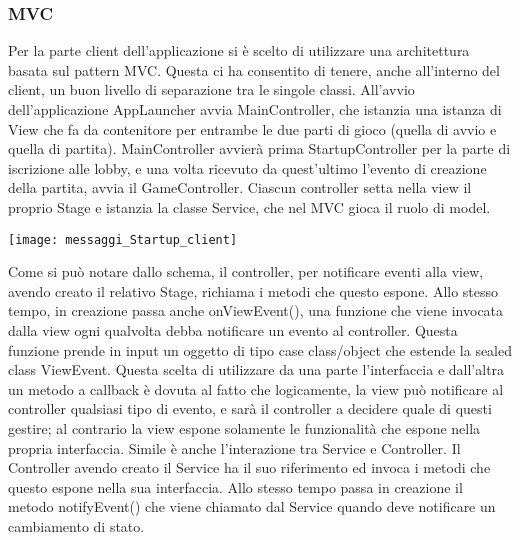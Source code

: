 \subsubsection{MVC}
Per la parte client dell’applicazione si è scelto di utilizzare una architettura basata sul pattern MVC\@.
Questa ci ha consentito di tenere, anche all’interno del client, un buon livello di separazione tra le singole classi.
\newline
All’avvio dell’applicazione AppLauncher avvia MainController, che istanzia una istanza di View che fa da contenitore per entrambe le due parti di gioco (quella di avvio e quella di partita).
MainController avvierà prima StartupController per la parte di iscrizione alle lobby, e una volta ricevuto da quest’ultimo l'evento di creazione della partita, avvia il GameController.
Ciascun controller setta nella view il proprio Stage e istanzia la classe Service, che nel MVC gioca il ruolo di model.
\begin{center}
    \texttt{[image: messaggi\_Startup\_client]}
\end{center}
Come si può notare dallo schema, il controller, per notificare eventi alla view, avendo creato il relativo Stage, richiama i metodi che questo espone.
\newline
Allo stesso tempo, in creazione passa anche onViewEvent(), una funzione che viene invocata dalla view ogni qualvolta debba notificare un evento al controller.
Questa funzione prende in input un oggetto di tipo case class/object che estende la sealed class ViewEvent.
Questa scelta di utilizzare da una parte l’interfaccia e dall’altra un metodo a callback è dovuta al fatto che logicamente, la view può notificare al controller qualsiasi tipo di evento, e sarà il controller a decidere quale di questi gestire;
al contrario la view espone solamente le funzionalità che espone nella propria interfaccia.
\newline
Simile è anche l’interazione tra Service e Controller.
Il Controller avendo creato il Service ha il suo riferimento ed invoca i metodi che questo espone nella sua interfaccia.
Allo stesso tempo passa in creazione il metodo notifyEvent() che viene chiamato dal Service quando deve notificare un cambiamento di stato.

